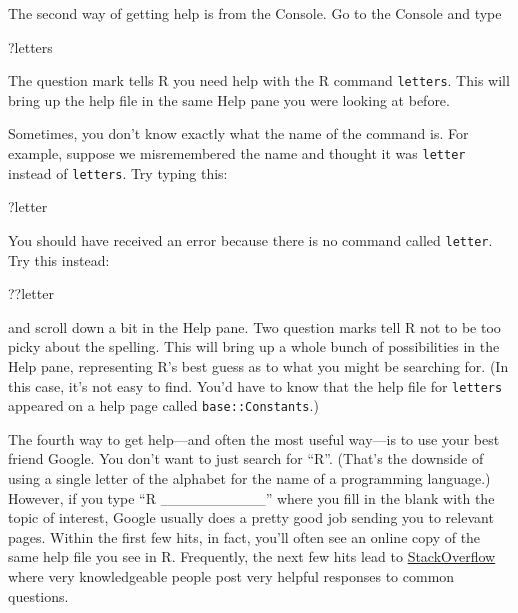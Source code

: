 \documentclass[
]{book}
\newenvironment{Shaded}{\begin{snugshade}}{\end{snugshade}}
\newcommand{\NormalTok}[1]{#1}
\begin{document}
The second way of getting help is from the Console. Go to the Console and type

\begin{Shaded}
\begin{Highlighting}[]
\NormalTok{?letters}
\end{Highlighting}
\end{Shaded}

The question mark tells R you need help with the R command \texttt{letters}. This will bring up the help file in the same Help pane you were looking at before.

Sometimes, you don't know exactly what the name of the command is. For example, suppose we misremembered the name and thought it was \texttt{letter} instead of \texttt{letters}. Try typing this:

\begin{Shaded}
\begin{Highlighting}[]
\NormalTok{?letter}
\end{Highlighting}
\end{Shaded}

You should have received an error because there is no command called \texttt{letter}. Try this instead:

\begin{Shaded}
\begin{Highlighting}[]
\NormalTok{??letter}
\end{Highlighting}
\end{Shaded}

and scroll down a bit in the Help pane. Two question marks tell R not to be too picky about the spelling. This will bring up a whole bunch of possibilities in the Help pane, representing R's best guess as to what you might be searching for. (In this case, it's not easy to find. You'd have to know that the help file for \texttt{letters} appeared on a help page called \texttt{base::Constants}.)

The fourth way to get help---and often the most useful way---is to use your best friend Google. You don't want to just search for ``R''. (That's the downside of using a single letter of the alphabet for the name of a programming language.) However, if you type ``R \_\_\_\_\_\_\_\_\_\_'' where you fill in the blank with the topic of interest, Google usually does a pretty good job sending you to relevant pages. Within the first few hits, in fact, you'll often see an online copy of the same help file you see in R. Frequently, the next few hits lead to \href{https://stackoverflow.com}{StackOverflow} where very knowledgeable people post very helpful responses to common questions.
\end{document}
